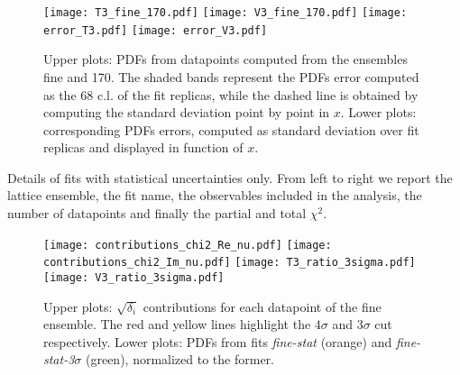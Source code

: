 \begin{figure}[h!]
    \centering
    \texttt{[image: T3\_fine\_170.pdf]}  
    \texttt{[image: V3\_fine\_170.pdf]} 
    \texttt{[image: error\_T3.pdf]}  
    \texttt{[image: error\_V3.pdf]}     
\caption{Upper plots: PDFs from datapoints computed from the ensembles fine and 170.
The shaded bands represent the PDFs error computed as the 68 c.l. of the fit replicas, while the dashed line is obtained by computing the standard deviation point by point in $x$.
Lower plots: corresponding PDFs errors, computed as standard deviation over fit replicas and 
displayed in function of $x$.}

\label{fig:pdfs_fine_170}
\end{figure}

\begin{table}[t]
	\renewcommand*{\arraystretch}{1.60}
	\scriptsize
	\centering
	
	\vspace{0.3cm}
	\caption{Details of fits with statistical uncertainties only. 
	From left to right we report the lattice ensemble, the fit name, 
	the observables included in the analysis, the number of datapoints and finally
	the partial and total $\chi^2$.}
	\label{tab:chi2_stat_fine_170}
\end{table}


\begin{figure}[h!]
    \center
    \texttt{[image: contributions\_chi2\_Re\_nu.pdf]}  
    \texttt{[image: contributions\_chi2\_Im\_nu.pdf]}
    \texttt{[image: T3\_ratio\_3sigma.pdf]}  
    \texttt{[image: V3\_ratio\_3sigma.pdf]}
\caption{Upper plots: $\sqrt{\delta_i}$ contributions for each datapoint of the fine ensemble. The red and
yellow lines highlight the $4\sigma$ and $3\sigma$ cut respectively. Lower plots: 
PDFs from fits \textit{fine-stat} (orange) and \textit{fine-stat-3$\sigma$} (green), normalized to the former.}
\label{fig:chi_contributions}
\end{figure}

